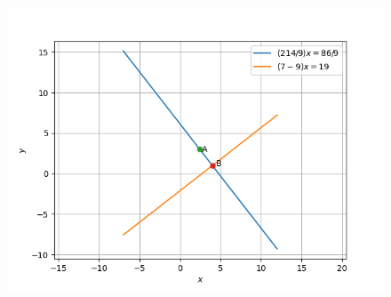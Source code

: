 \documentclass[journal,12pt,twocolumn]{IEEEtran}
\begin{document}
\begin{figure}[!htb]
    \centering
    \includegraphics[width=\columnwidth]{11/10/3/10/cvxpy/figs/lines.png}
    \caption{}
    \label{fig:11/10/3/10/cvxpy/line}
\end{figure}
\end{document}
